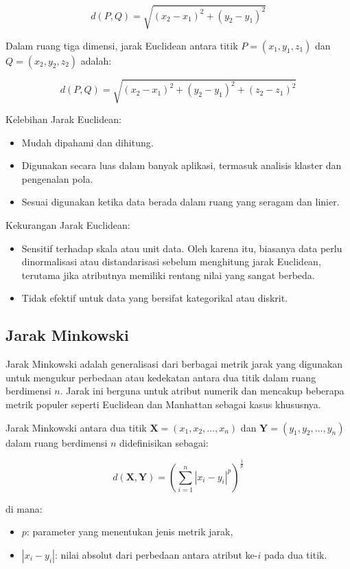 \documentclass[
  oneside]{book}
\begin{document}
\[
d(P, Q) = \sqrt{(x_2 - x_1)^2 + (y_2 - y_1)^2}
\]

Dalam ruang tiga dimensi, jarak Euclidean antara titik \(P = (x_1, y_1, z_1)\) dan \(Q = (x_2, y_2, z_2)\) adalah:

\[
d(P, Q) = \sqrt{(x_2 - x_1)^2 + (y_2 - y_1)^2 + (z_2 - z_1)^2}
\]

Kelebihan Jarak Euclidean:

\begin{itemize}
\item
  Mudah dipahami dan dihitung.
\item
  Digunakan secara luas dalam banyak aplikasi, termasuk analisis klaster dan pengenalan pola.
\item
  Sesuai digunakan ketika data berada dalam ruang yang seragam dan linier.
\end{itemize}

Kekurangan Jarak Euclidean:

\begin{itemize}
\item
  Sensitif terhadap skala atau unit data. Oleh karena itu, biasanya data perlu dinormalisasi atau distandarisasi sebelum menghitung jarak Euclidean, terutama jika atributnya memiliki rentang nilai yang sangat berbeda.
\item
  Tidak efektif untuk data yang bersifat kategorikal atau diskrit.
\end{itemize}

\subsection{Jarak Minkowski}\label{jarak-minkowski}

Jarak Minkowski adalah generalisasi dari berbagai metrik jarak yang digunakan untuk mengukur perbedaan atau kedekatan antara dua titik dalam ruang berdimensi \(n\). Jarak ini berguna untuk atribut numerik dan mencakup beberapa metrik populer seperti Euclidean dan Manhattan sebagai kasus khususnya.

Jarak Minkowski antara dua titik \(\mathbf{X} = (x_1, x_2, \ldots, x_n)\) dan \(\mathbf{Y} = (y_1, y_2, \ldots, y_n)\) dalam ruang berdimensi \(n\) didefinisikan sebagai:

\[
d(\mathbf{X}, \mathbf{Y}) = \left( \sum_{i=1}^n |x_i - y_i|^p \right)^{\frac{1}{p}}
\]

di mana:

\begin{itemize}
\item
  \(p\): parameter yang menentukan jenis metrik jarak,
\item
  \(|x_i - y_i|\): nilai absolut dari perbedaan antara atribut ke-\(i\) pada dua titik.
\end{itemize}
\end{document}
